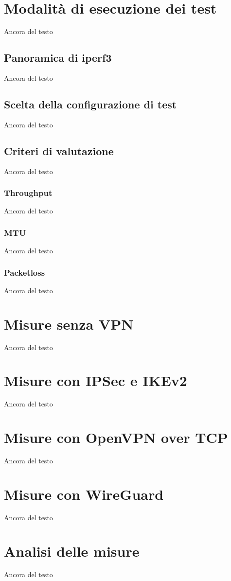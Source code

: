 \section{Modalità di esecuzione dei test}
Ancora del testo

\subsection{Panoramica di iperf3}
Ancora del testo

\subsection{Scelta della configurazione di test}
Ancora del testo

\subsection{Criteri di valutazione}
Ancora del testo

\subsubsection{Throughput}
Ancora del testo

\subsubsection{MTU}
Ancora del testo

\subsubsection{Packetloss}
Ancora del testo

\section{Misure senza VPN}
Ancora del testo

\section{Misure con IPSec e IKEv2}
Ancora del testo

\section{Misure con OpenVPN over TCP}
Ancora del testo

\section{Misure con WireGuard}
Ancora del testo

\section{Analisi delle misure}
Ancora del testo